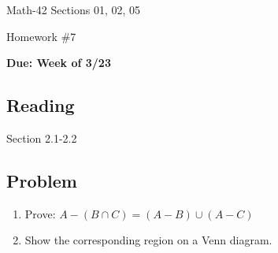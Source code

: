 \documentclass[letterpaper,12pt,fleqn]{article}
\begin{document}
\begin{center}
  \large
  Math-42 Sections 01, 02, 05

  \Large
  Homework \#7

  \large
  \textbf{Due: Week of 3/23}
\end{center}

\subsection*{Reading}

Section 2.1-2.2

\subsection*{Problem}

\begin{enumerate}[left=0in]
\item Prove: \(A-(B\cap C)=(A-B)\cup(A-C)\)
\item Show the corresponding region on a Venn diagram.
\end{enumerate}
\end{document}
